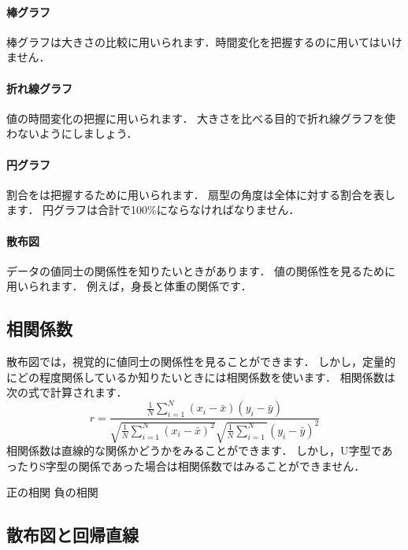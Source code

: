 \documentclass[12pt, a4j]{jreport}
\begin{document}
\paragraph{棒グラフ}

棒グラフは大きさの比較に用いられます．時間変化を把握するのに用いてはいけません．

\paragraph{折れ線グラフ}

値の時間変化の把握に用いられます．
大きさを比べる目的で折れ線グラフを使わないようにしましょう．

\paragraph{円グラフ}

割合をは把握するために用いられます．
扇型の角度は全体に対する割合を表します．
円グラフは合計で100\%にならなければなりません．

\paragraph{散布図}

データの値同士の関係性を知りたいときがあります．
値の関係性を見るために用いられます．
例えば，身長と体重の関係です．


\subsection{相関係数}

散布図では，視覚的に値同士の関係性を見ることができます．
しかし，定量的にどの程度関係しているか知りたいときには相関係数を使います．
相関係数は次の式で計算されます．
\begin{equation}
    \label{eq:1}
    r = \frac{\frac{1}{N} \sum_{i=1}^N (x_i - \bar{x})(y_i - \bar{y})}{\sqrt{\frac{1}{N} \sum_{i=1}^N (x_i - \bar{x})^2} \sqrt{\frac{1}{N} \sum_{i=1}^N}(y_i - \bar{y})^2}
\end{equation}
相関係数は直線的な関係かどうかをみることができます．
しかし，U字型であったりS字型の関係であった場合は相関係数ではみることができません．

正の相関
負の相関

\subsection{散布図と回帰直線}
\end{document}
